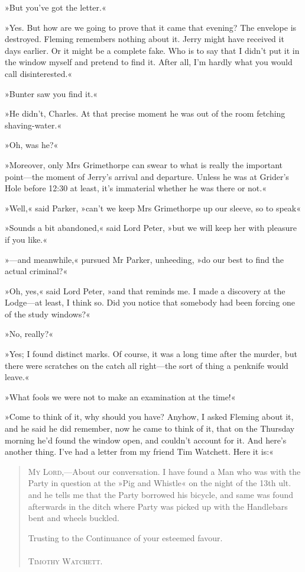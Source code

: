 »But you've got the letter.«

»Yes. But how are we going to prove that it came that evening? The envelope is destroyed. Fleming remembers nothing about it. Jerry might have received it days earlier. Or it might be a complete fake. Who is to say that I didn't put it in the window myself and pretend to find it. After all, I'm hardly what you would call disinterested.«

»Bunter saw you find it.«

»He didn't, Charles. At that precise moment he was out of the room fetching shaving-water.«

»Oh, was he?«

»Moreover, only Mrs Grimethorpe can swear to what is really the important point\allowbreak---\allowbreak the moment of Jerry's arrival and departure. Unless he was at Grider's Hole before 12:30 at least, it's immaterial whether he was there or not.«

»Well,« said Parker, »can't we keep Mrs Grimethorpe up our sleeve, so to speak\longdash«

»Sounds a bit abandoned,« said Lord Peter, »but we will keep her with pleasure if you like.«

»---and meanwhile,« pursued Mr Parker, unheeding, »do our best to find the actual criminal?«

»Oh, yes,« said Lord Peter, »and that reminds me. I made a discovery at the Lodge\allowbreak---\allowbreak at least, I think so. Did you notice that somebody had been forcing one of the study windows?«

»No, really?«

»Yes; I found distinct marks. Of course, it was a long time after the murder, but there were scratches on the catch all right\allowbreak---\allowbreak the sort of thing a penknife would leave.«

»What fools we were not to make an examination at the time!«

»Come to think of it, why should you have? Anyhow, I asked Fleming about it, and he said he did remember, now he came to think of it, that on the Thursday morning he'd found the window open, and couldn't account for it. And here's another thing. I've had a letter from my friend Tim Watchett. Here it is:«

\begin{quote}
\textsc{My Lord},---About our conversation. I have found a Man who was with the Party in question at the »Pig and Whistle« on the night of the 13th ult. and he tells me that the Party borrowed his bicycle, and same was found afterwards in the ditch where Party was picked up with the Handlebars bent and wheels buckled.

\begin{flushright}
\begin{minipage}{.5\textwidth}
Trusting to the Continuance of your esteemed favour.\\
~\\
\textsc{Timothy Watchett.}
\end{minipage}
\end{flushright}
\end{quote}

